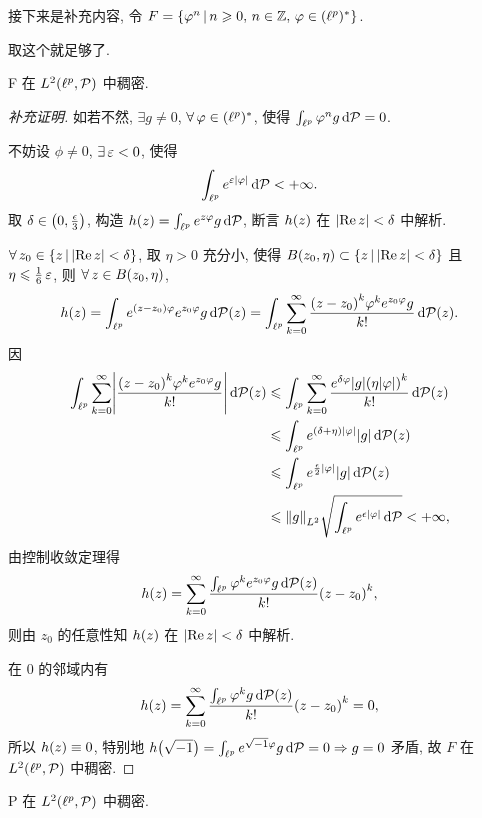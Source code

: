 接下来是补充内容, 令 $F=\left\{\varphi^{n}\,\middle\vert\,n\geqslant0,\,n\in\mathbb{Z},\,\varphi\in(\ell^p)^*\right\}$.
\begin{remark}[补充]
取这个就足够了.
\end{remark}
\begin{theorem}[补充]
F 在 $L^2\xk{\lp,\PP}$ 中稠密.
\end{theorem}
\begin{proof}[补充证明]
如若不然, $\exists g\neq 0$, $\forall\phi\in\colp$, 使得 $\int_{\ell^p}\varphi^{n}g\,\mathrm{d}\mathcal{P}=0$.\par 
不妨设 $\phi\neq 0$, $\exists \eps<0$, 使得
\[\int_{\ell^p}e^{\operatorname{\varepsilon}\left\vert\varphi\right\vert}\,\mathrm{d}\mathcal{P}<+\infty.\]
取 $\delta\in\left(0,\frac{\epsilon	}{3}\right)$, 构造 $h\xk{z}=\int_{\lp}e^{z\phi}g\dd\PP$, 断言 $h\xk{z}$ 在 $\left\vert\mathrm{Re}\, z\right\vert<\delta$ 中解析.\par 
$\forall z_{0}\in\jh{z}{\jd{\re z}<\delta}$, 取 $\eta>0$ 充分小, 使得 $B\xk{z_{0},\eta}\subset\jh{z}{\jd{\re z}<\delta}$ 且 $\eta\leqslant\frac{1}{6}\operatorname{\varepsilon}$, 则 $\forall z\in B\xk{z_{0},\eta}$, 
\[h\xk{z}=\int_{\lp}e^{\xk{z-z_{0}}\phi}e^{z_{0}\phi}g\dd\PP\xk{z}=\int_{\lp}\sum_{k=0}^{\infty}\frac{\xk{z-z_{0}}^{k}\phi^{k}e^{z_{0}\phi}g}{k!}\dd\PP\xk{z}.\]
因
\begin{align*}
\int_{\lp}\sum_{k=0}^{\infty}\jd{\frac{\xk{z-z_{0}}^{k}\phi^{k}e^{z_{0}\phi}g}{k!}}\dd\PP\xk{z} &\leq \int_{\lp}\sum_{k=0}^{\infty}\frac{e^{\delta\phi}\jd{g}\xk{\eta\jd{\phi}}^{k}}{k!}\dd\PP\xk{z}\\
&\leq \int_{\lp}e^{\xk{\delta+\eta}\jd{\phi}}\jd{g}\dd\PP\xk{z}\\
&\leq \int_{\lp}e^{\frac{\epsilon}{2}\jd{\phi}}\jd{g}\dd\PP\xk{z}\\
&\leq \fs{g}_{L^2}\sqrt{\int_{\lp}e^{\epsilon\jd{\phi}}\dd\PP}<+\infty,
\end{align*}
由控制收敛定理得
\[h\xk{z}=\sum_{k=0}^{\infty}\frac{\int_{\lp}\phi^{k}e^{z_{0}\phi}g\dd\PP\xk{z}}{k!}\xk{z-z_{0}}^{k},\]
则由 $z_{0}$ 的任意性知 $h\xk{z}$ 在 $\left\vert\mathrm{Re}\, z\right\vert<\delta$ 中解析.\par 
在 $0$ 的邻域内有
\[h\xk{z}=\sum_{k=0}^{\infty}\frac{\int_{\lp}\phi^{k}g\dd\PP\xk{z}}{k!}\xk{z-z_{0}}^{k}=0,\]
所以 $h\xk{z}\equiv 0$, 特别地 $h\xk{\xs}=\int_{\lp}e^{\xs\phi}g\dd\PP=0\Rightarrow g=0$ 矛盾, 故 $F$ 在 $L^2\xk{\lp,\PP}$ 中稠密.
\end{proof}
\begin{theorem}[补充]
P 在 $L^2\xk{\lp,\PP}$ 中稠密.
\end{theorem}
